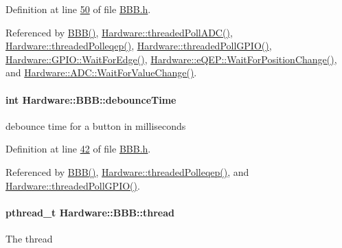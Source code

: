 Definition at line \hyperlink{_b_b_b_8h_source_l00050}{50} of file \hyperlink{_b_b_b_8h_source}{B\+B\+B.\+h}.



Referenced by \hyperlink{_b_b_b_8cpp_source_l00012}{B\+B\+B()}, \hyperlink{_a_d_c_8cpp_source_l00121}{Hardware\+::threaded\+Poll\+A\+D\+C()}, \hyperlink{eqep_8cpp_source_l00242}{Hardware\+::threaded\+Polleqep()}, \hyperlink{_g_p_i_o_8cpp_source_l00266}{Hardware\+::threaded\+Poll\+G\+P\+I\+O()}, \hyperlink{_g_p_i_o_8cpp_source_l00026}{Hardware\+::\+G\+P\+I\+O\+::\+Wait\+For\+Edge()}, \hyperlink{eqep_8cpp_source_l00124}{Hardware\+::e\+Q\+E\+P\+::\+Wait\+For\+Position\+Change()}, and \hyperlink{_a_d_c_8cpp_source_l00074}{Hardware\+::\+A\+D\+C\+::\+Wait\+For\+Value\+Change()}.

\hypertarget{class_hardware_1_1_b_b_b_a353a2d7d4fbade337e5173b484b20b22}{}
\paragraph[{debounce\+Time}]{\setlength{\rightskip}{0pt plus 5cm}int Hardware\+::\+B\+B\+B\+::debounce\+Time}\label{class_hardware_1_1_b_b_b_a353a2d7d4fbade337e5173b484b20b22}
debounce time for a button in milliseconds 

Definition at line \hyperlink{_b_b_b_8h_source_l00042}{42} of file \hyperlink{_b_b_b_8h_source}{B\+B\+B.\+h}.



Referenced by \hyperlink{_b_b_b_8cpp_source_l00012}{B\+B\+B()}, \hyperlink{eqep_8cpp_source_l00242}{Hardware\+::threaded\+Polleqep()}, and \hyperlink{_g_p_i_o_8cpp_source_l00266}{Hardware\+::threaded\+Poll\+G\+P\+I\+O()}.

\hypertarget{class_hardware_1_1_b_b_b_a3ad3fe886705bfc242ef58dc5329166e}{}
\paragraph[{thread}]{\setlength{\rightskip}{0pt plus 5cm}pthread\+\_\+t Hardware\+::\+B\+B\+B\+::thread\hspace{0.3cm}{\ttfamily [protected]}}\label{class_hardware_1_1_b_b_b_a3ad3fe886705bfc242ef58dc5329166e}
The thread 

